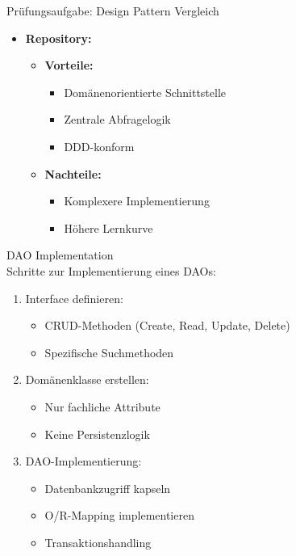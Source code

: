 \begin{example2}{Prüfungsaufgabe: Design Pattern Vergleich}
\begin{itemize}
    \item \textbf{Repository:}
    \begin{itemize}
        \item \textbf{Vorteile:}
        \begin{itemize}
            \item Domänenorientierte Schnittstelle
            \item Zentrale Abfragelogik
            \item DDD-konform
        \end{itemize}
        \item \textbf{Nachteile:}
        \begin{itemize}
            \item Komplexere Implementierung
            \item Höhere Lernkurve
        \end{itemize}
    \end{itemize}
\end{itemize}
\end{example2}

\begin{KR}{DAO Implementation}\\
Schritte zur Implementierung eines DAOs:
\begin{enumerate}
    \item Interface definieren:
    \begin{itemize}
        \item CRUD-Methoden (Create, Read, Update, Delete)
        \item Spezifische Suchmethoden
    \end{itemize}
    \item Domänenklasse erstellen:
    \begin{itemize}
        \item Nur fachliche Attribute
        \item Keine Persistenzlogik
    \end{itemize}
    \item DAO-Implementierung:
    \begin{itemize}
        \item Datenbankzugriff kapseln
        \item O/R-Mapping implementieren
        \item Transaktionshandling
    \end{itemize}
\end{enumerate}
\end{KR}



